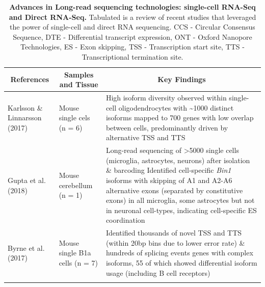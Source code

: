 \begin{landscape}
	\small %
	\setlength\tabcolsep{2pt} %
	\renewcommand{\arraystretch}{1}
	\begin{longtable}[c]{p{4cm}p{4cm}p{18cm}}
		\caption[Long-read sequencing studies on single cells and using RNA]%
		{\textbf{Advances in Long-read sequencing technologies: single-cell RNA-Seq and Direct RNA-Seq.} Tabulated is a review of recent studies that leveraged the power of single-cell and direct RNA sequencing. CCS - Circular Consensus Sequence, DTE - Differential transcript expression, ONT - Oxford Nanopore Technologies, ES - Exon skipping, TSS - Transcription start site, TTS - Transcriptional termination site.}
		\label{tab: longread_advancedstudies}\\
		
		\toprule
		\multicolumn{1}{c}{References} &
		\multicolumn{1}{c}{Samples and Tissue} &
		\multicolumn{1}{c}{Key Findings} \\* \midrule
		\endfirsthead
		\endhead
		\bottomrule
		\endfoot
		\endlastfoot
		\centering Karlsson \& Linnarsson (2017)\cite{Karlsson2017} &
		\centering Mouse single cels (n = 6)  &
		\tabitem High isoform diversity observed within single-cell oligodendrocytes with \textasciitilde1000 distinct isoforms mapped to 700 genes with low overlap between cells, predominantly driven by alternative TSS and TTS \\
		\hdashline[0.5pt/5pt]	
		
		\centering Gupta et al. (2018) \cite{Gupta2018} &
		\centering Mouse cerebellum (n = 1)  &
		\tabitem Long-read sequencing of >5000 single cells (microglia, astrocytes, neurons) after isolation \& barcoding \newline 
		\tabitem Identified cell-specific \textit{Bin1} isoforms with skipping of A1 and A2-A6 alternative exons (separated by constitutive exons) in all microglia, some astrocytes but not in neuronal cell-types, indicating cell-specific ES coordination \\
		\hdashline[0.5pt/5pt]			
		
		\centering Byrne et al. (2017)\cite{Byrne2017} &
		\centering Mouse single B1a cells (n = 7) &
		\tabitem Identified thousands of novel TSS and TTS (within 20bp bins due to lower error rate) \& hundreds of splicing events \newline
		\tabitem 160 genes with complex isoforms, 55 of which showed differential isoform usage (including B cell receptors) \\
		\hdashline[0.5pt/5pt]
		

\end{longtable}
\end{landscape}
